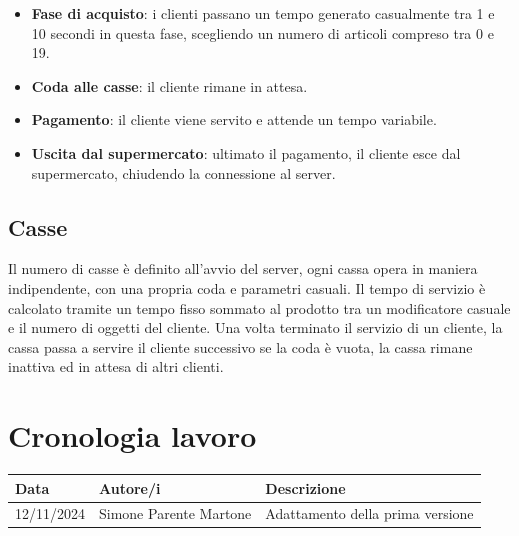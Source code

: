 \documentclass[a4paper, 12pt]{article}
\begin{document}
\begin{itemize}[noitemsep,topsep=0pt,parsep=0pt,partopsep=0pt]
    \item \textbf{Fase di acquisto}: i clienti passano un tempo generato casualmente
    tra 1 e 10 secondi in questa fase, scegliendo un numero di articoli compreso
    tra 0 e 19.
    \item \textbf{Coda alle casse}: il cliente rimane in attesa.
    \item \textbf{Pagamento}: il cliente viene servito e attende un tempo
    variabile.
    \item \textbf{Uscita dal supermercato}: ultimato il pagamento, il cliente esce dal
    supermercato, chiudendo la connessione al server.

\end{itemize}


\subsection{Casse}
Il numero di casse è definito all'avvio del server, ogni cassa opera in 
maniera indipendente, con una propria coda e parametri casuali.
Il tempo di servizio è calcolato tramite un tempo fisso sommato al prodotto tra
un modificatore casuale e il numero di oggetti del cliente.
Una volta terminato il servizio di un cliente, la cassa passa a servire il cliente successivo
se la coda è vuota, la cassa rimane inattiva ed in attesa di altri clienti.

\section{Cronologia lavoro}

\begin{center}
    \begin{tabular}{lll}
        \hline
        \textbf{Data} & \textbf{Autore/i} & \textbf{Descrizione} \\
        \hline
        12/11/2024 & Simone Parente Martone & Adattamento della prima versione \\
        \hline
    \end{tabular}
    \end{center}
    
\end{document}
